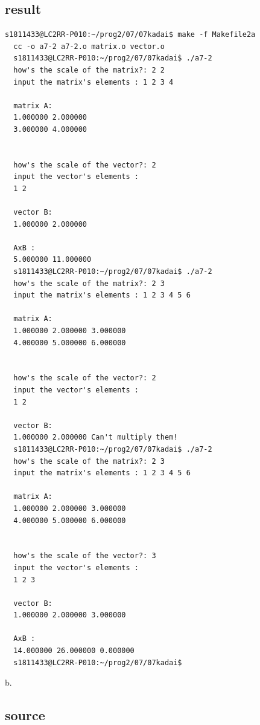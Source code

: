 \documentclass[10pt,a4paper]{jsarticle}
\begin{document}
\subsection{result}
\begin{lstlisting}[basicstyle=\ttfamily\footnotesize,frame=single,breaklines=tr\
  ue]
  s1811433@LC2RR-P010:~/prog2/07/07kadai$ make -f Makefile2a
  cc -o a7-2 a7-2.o matrix.o vector.o
  s1811433@LC2RR-P010:~/prog2/07/07kadai$ ./a7-2
  how's the scale of the matrix?: 2 2
  input the matrix's elements : 1 2 3 4

  matrix A:
  1.000000 2.000000
  3.000000 4.000000


  how's the scale of the vector?: 2
  input the vector's elements :
  1 2

  vector B:
  1.000000 2.000000

  AxB :
  5.000000 11.000000
  s1811433@LC2RR-P010:~/prog2/07/07kadai$ ./a7-2
  how's the scale of the matrix?: 2 3
  input the matrix's elements : 1 2 3 4 5 6

  matrix A:
  1.000000 2.000000 3.000000
  4.000000 5.000000 6.000000


  how's the scale of the vector?: 2
  input the vector's elements :
  1 2

  vector B:
  1.000000 2.000000 Can't multiply them!
  s1811433@LC2RR-P010:~/prog2/07/07kadai$ ./a7-2
  how's the scale of the matrix?: 2 3
  input the matrix's elements : 1 2 3 4 5 6

  matrix A:
  1.000000 2.000000 3.000000
  4.000000 5.000000 6.000000


  how's the scale of the vector?: 3
  input the vector's elements :
  1 2 3

  vector B:
  1.000000 2.000000 3.000000

  AxB :
  14.000000 26.000000 0.000000
  s1811433@LC2RR-P010:~/prog2/07/07kadai$
\end{lstlisting}



b.
\subsection{source}


\end{document}
